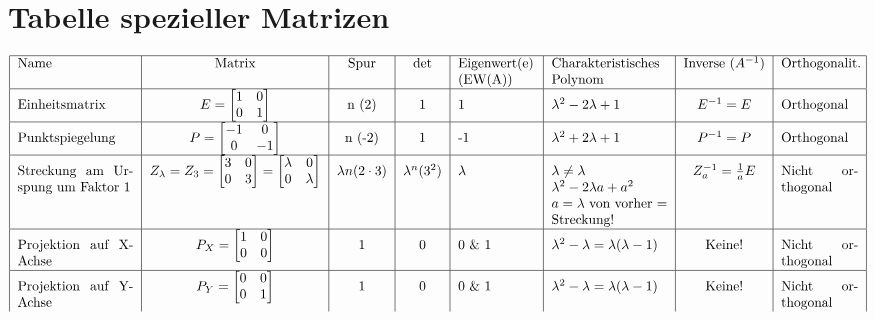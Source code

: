 \clearpage
\begin{sidewaystable}
	\section{Tabelle spezieller Matrizen}
		\begin{equation*}
			\begin{tabular}{|p{3cm}|c|c|c|p{2cm}|p{3cm}|c|p{2cm}|}
				\hline
					Name & Matrix & Spur & det & Eigenwert(e) (EW(A)) & Charakteristisches Polynom & Inverse $(A^{-1})$ & Orthogonalit. \\
				\hline
					Einheitsmatrix & $E = \begin{bmatrix} 1 & 0 \\ 0 & 1 \end{bmatrix}$	& n (2) & 1 & 1 & $\lambda^2 -2 \lambda + 1$ & 
					$E^{-1} = E$ & Orthogonal \\
				\hline
					Punktspiegelung & $P = \begin{bmatrix} -1 & 0 \\ 0 & -1 \end{bmatrix}$ & n (-2) & 1 & -1 & $\lambda^2 +2 \lambda + 1$ & 
					$P^{-1} = P$ & Orthogonal \\
				\hline
					Streckung am Urspung um Faktor 1 & $Z_{\lambda} = Z_{3} = \begin{bmatrix} 3 & 0 \\ 0 & 3 \end{bmatrix} = \begin{bmatrix} \lambda & 0 \\ 0 & \lambda \end{bmatrix}$ & $\lambda n (2 \cdot 3)$ & $\lambda^n (3^2)$ & $\lambda$ & $\lambda \neq \lambda$ \endgraf $\lambda^2 -2 \lambda a + a^2$\endgraf $a = \lambda$ von vorher = Streckung! & \endgraf $Z_{a}^{-1} = \frac{1}{a} E$ & Nicht orthogonal \\
				\hline
					Projektion auf X-Achse & $P_{X} = \begin{bmatrix} 1 & 0 \\ 0 & 0 \end{bmatrix}$ & 1 & 0 & 0 \& 1 & $
					\lambda^2 - \lambda = \lambda (\lambda - 1)$ & Keine! & Nicht orthogonal \\
				\hline
					Projektion auf Y-Achse & $P_{Y} = \begin{bmatrix} 0 & 0 \\ 0 & 1 \end{bmatrix}$ & 1 & 0 & 0 \& 1 & $
					\lambda^2 - \lambda = \lambda (\lambda - 1)$ & Keine! & Nicht orthogonal \\

\end{tabular}
\end{equation*}
\end{sidewaystable}
